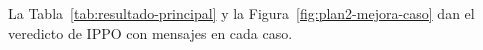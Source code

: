 La Tabla~\ref{tab:resultado-principal} y la
Figura~\ref{fig:plan2-mejora-caso} dan el veredicto de IPPO con mensajes
en cada caso.

